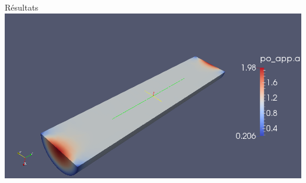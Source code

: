 \documentclass{beamer}
\begin{document}
\begin{frame}{Résultats}
\centering
\includegraphics[scale=0.2]{psi0-clip}
\begin{figure}[H]
\end{figure}
\end{frame}
\end{document}
